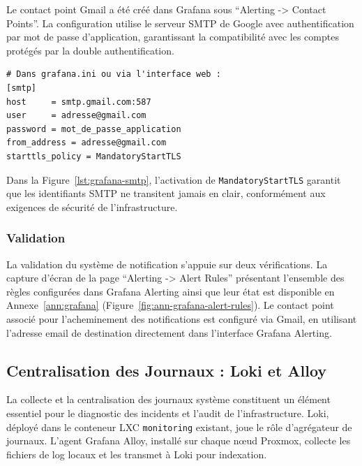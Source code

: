\par Le contact point Gmail a été créé dans Grafana sous ``Alerting -> Contact Points''. La configuration utilise le serveur SMTP de Google avec authentification par mot de passe d'application, garantissant la compatibilité avec les comptes protégés par la double authentification.\\

\begin{lstlisting}[style=sonacode,language={},caption={Paramètres SMTP du contact point Gmail},label={lst:grafana-smtp}]
# Dans grafana.ini ou via l'interface web :
[smtp]
host     = smtp.gmail.com:587
user     = adresse@gmail.com
password = mot_de_passe_application
from_address = adresse@gmail.com
starttls_policy = MandatoryStartTLS
\end{lstlisting}

\par Dans la Figure~\ref{lst:grafana-smtp}, l'activation de \texttt{MandatoryStartTLS} garantit que les identifiants SMTP ne transitent jamais en clair, conformément aux exigences de sécurité de l'infrastructure.

\subsubsection{Validation}

\par La validation du système de notification s'appuie sur deux vérifications. La capture d'écran de la page ``Alerting -> Alert Rules'' présentant l'ensemble des règles configurées dans Grafana Alerting ainsi que leur état est disponible en Annexe~\ref{ann:grafana} (Figure~\ref{fig:ann-grafana-alert-rules}). Le contact point associé pour l'acheminement des notifications est configuré via Gmail, en utilisant l'adresse email de destination directement dans l'interface Grafana Alerting.\\

\subsection{Centralisation des Journaux : Loki et Alloy}

\par La collecte et la centralisation des journaux système constituent un élément essentiel pour le diagnostic des incidents et l'audit de l'infrastructure. Loki, déployé dans le conteneur LXC \texttt{monitoring} existant, joue le rôle d'agrégateur de journaux. L'agent Grafana Alloy, installé sur chaque nœud Proxmox, collecte les fichiers de log locaux et les transmet à Loki pour indexation.

